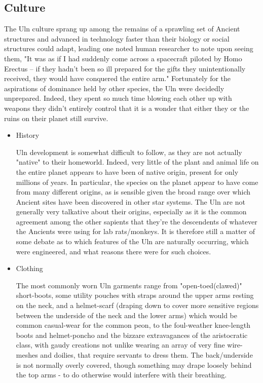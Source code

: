 \subsection{Culture}
The Uln culture sprang up among the remains of a sprawling set of
Ancient structures and advanced in technology faster than their
biology or social structures could adapt, leading one noted human
researcher to note upon seeing them, "It was as if I had suddenly come
across a spacecraft piloted by Homo Erectus -- if they hadn't been so
ill prepared for the gifts they unintentionally received, they would
have conquered the entire arm." Fortunately for the aspirations of
dominance held by other species, the Uln were decidedly
unprepared. Indeed, they spent so much time blowing each other up with
weapons they didn't entirely control that it is a wonder that either
they or the ruins on their planet still survive.
\begin{itemize}
\item History

Uln development is somewhat difficult to follow, as they are not
actually "native" to their homeworld. Indeed, very little of the plant
and animal life on the entire planet appears to have been of native
origin, present for only millions of years. In particular, the species
on the planet appear to have come from many different origins, as is
sensible given the broad range over which Ancient sites have been
discovered in other star systems. The Uln are not generally very
talkative about their origins, especially as it is the common
agreement among the other sapients that they're the descendents of
whatever the Ancients were using for lab rats/monkeys. It is therefore
still a matter of some debate as to which features of the Uln are
naturally occurring, which were engineered, and what reasons there
were for such choices.

\item Clothing

The most commonly worn Uln garments range from "open-toed(clawed)"
short-boots, some utility pouches with straps around the upper arms
resting on the neck, and a helmet-scarf (draping down to cover more
sensitive regions between the underside of the neck and the lower
arms) which would be common casual-wear for the common peon, to the
foul-weather knee-length boots and helmet-poncho and the bizzare
extravagances of the aristocratic class, with gaudy creations not
unlike wearing an array of very fine wire-meshes and doilies, that
require servants to dress them. The back/underside is not normally
overly covered, though something may drape loosely behind the top arms
- to do otherwise would interfere with their breathing.
\end{itemize}
